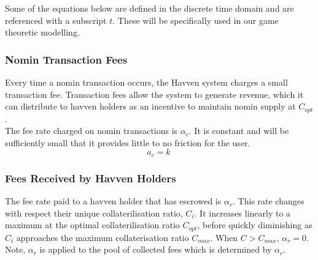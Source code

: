 \noindent Some of the equations below are defined in the discrete time domain and are referenced with a subscript $t$. These will be specifically used in our game theoretic modelling.

\subsubsection{Nomin Transaction Fees} Every time a nomin transaction occurs, the Havven system charges a small transaction fee. Transaction fees allow the system to generate revenue, which it can distribute to havven holders as an incentive to maintain nomin supply at $C_{opt}$. \\

\noindent The fee rate charged on nomin transactions is $\alpha_c$. It is constant and will be sufficiently small that it provides little to no friction for the user.\\

\begin{equation}
a_c = k \ \label{eq:5}
\end{equation}

\begin{center}
\end{center}

\newpage
\subsubsection{Fees Received by Havven Holders}

\noindent The fee rate paid to a havven holder that has escrowed is $\alpha_r$. This rate changes with respect their unique collaterilisation ratio, $C_i$. It increases linearly to a maximum at the optimal collaterilisation ratio $C_{opt}$, before quickly diminishing as $C_i$ approaches the maximum collaterisation ratio $C_{max}$. When $C > C_{max}$, $\alpha_r = 0$. Note, $\alpha_r$ is applied to the pool of collected fees which is determined by $\alpha_c$. \\

